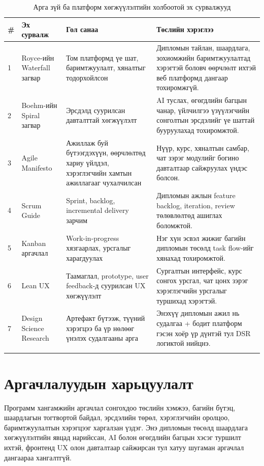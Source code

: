 \begin{longtable}{|p{}|p{}|p{}|p{}|}
  \hline
  \textbf{\#} & \textbf{Эх сурвалж} & \textbf{Гол санаа} & \textbf{Төслийн хэрэглээ} \\ \hline
  1 & Royce-ийн Waterfall загвар \cite{royce_waterfall_1970} & Том платформд үе шат, баримтжуулалт, хяналтыг тодорхойлсон & Дипломын тайлан, шаардлага, зохиомжийн баримтжуулалтад хэрэгтэй боловч өөрчлөлт ихтэй веб платформд дангаар тохиромжгүй. \\ \hline
  2 & Boehm-ийн Spiral загвар \cite{boehm_spiral_1988} & Эрсдэлд суурилсан давталттай хөгжүүлэлт & AI туслах, өгөгдлийн багцын чанар, үйлчилгээ үзүүлэгчийн сонголтын эрсдэлийг үе шаттай бууруулахад тохиромжтой. \\ \hline
  3 & Agile Manifesto \cite{agile_manifesto_2001} & Ажиллаж буй бүтээгдэхүүн, өөрчлөлтөд хариу үйлдэл, хэрэглэгчийн хамтын ажиллагааг чухалчилсан & Нүүр, курс, хяналтын самбар, чат зэрэг модулийг богино давталтаар сайжруулах үндэс болсон. \\ \hline
  4 & Scrum Guide \cite{scrum_guide_2020} & Sprint, backlog, incremental delivery зарчим & Дипломын ажлын feature backlog, iteration, review төлөвлөлтөд ашиглах боломжтой. \\ \hline
  5 & Kanban аргачлал \cite{anderson_kanban_2010} & Work-in-progress хязгаарлах, урсгалыг харагдуулах & Нэг хүн эсвэл жижиг багийн дипломын төсөлд task flow-ийг хянахад тохиромжтой. \\ \hline
  6 & Lean UX \cite{lean_ux_2013} & Таамаглал, prototype, user feedback-д суурилсан UX хөгжүүлэлт & Сургалтын интерфейс, курс сонгох урсгал, чат цонх зэрэг хэрэглэгчийн урсгалыг туршихад хэрэгтэй. \\ \hline
  7 & Design Science Research \cite{hevner_dsr_2004} & Артефакт бүтээж, түүний хэрэгцээ ба үр нөлөөг үнэлэх судалгааны арга & Энэхүү дипломын ажил нь судалгаа + бодит платформ гэсэн хоёр үр дүнтэй тул DSR логиктой нийцнэ. \\ \hline
  \caption{Арга зүй ба платформ хөгжүүлэлтийн холбоотой эх сурвалжууд}
  \label{tab:method-related-works}
\end{longtable}

\section{Аргачлалуудын харьцуулалт}
Программ хангамжийн аргачлал сонгохдоо төслийн хэмжээ, багийн бүтэц, шаардлагын тогтвортой байдал, эрсдэлийн төрөл, хэрэглэгчийн оролцоо, баримтжуулалтын хэрэгцээг харгалзан үздэг. Энэ дипломын төсөлд шаардлага хөгжүүлэлтийн явцад нарийссан, AI болон өгөгдлийн багцын хэсэг туршилт ихтэй, фронтенд UX олон давталтаар сайжирсан тул хатуу шугаман аргачлал дангаараа хангалтгүй.

